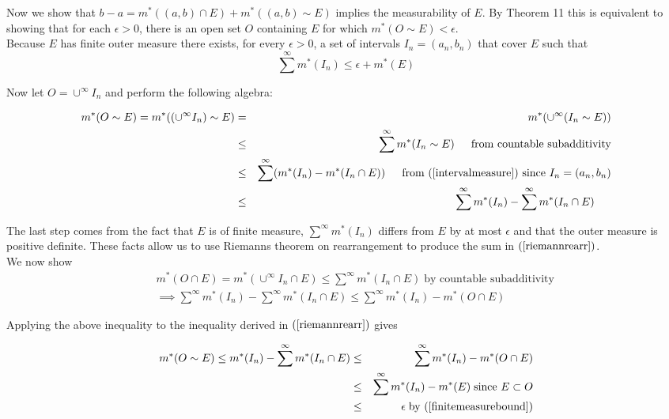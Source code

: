 \documentclass[11pt,reqno]{article}
\begin{document}
Now we show that $b - a =  m^*((a,b) \cap E) + m^*((a,b) \sim E)$ implies the measurability of $E$. By Theorem 11 this is equivalent to showing that for each $\epsilon > 0$,  there is an open set $O$ containing $E$ for which $m^*(O \sim E) < \epsilon$.\\

Because $E$ has finite outer measure there exists, for every $\epsilon > 0$, a set of intervals $I_n = (a_n, b_n)$ that cover $E$ such that 
\begin{equation} 
\sum^\infty m^*(I_n)  \le \epsilon  + m^*(E) \label{finitemeasurebound} 
\end{equation}

Now let $O = \cup^\infty I_n$ and perform the following algebra:

\begin{eqnarray}
m^*(O \sim E) = m^*((\cup^\infty I_n) \sim E) &=& m^*(\cup^\infty (I_n \sim E))  \nonumber \\
&\le& \sum^\infty m^*(I_n \sim E) \hspace{15px} \text{from countable subadditivity} \nonumber \\
&\le& \sum^\infty (m^*(I_n) -  m^*(I_n \cap E)) \hspace{15px} \text{from (\ref{intervalmeasure}) since $I_n = (a_n, b_n)$} \nonumber \\
&\le& \sum^\infty m^*(I_n) -  \sum^\infty m^*(I_n \cap E) \hspace{15px} \label{riemannrearr}
\end{eqnarray}

The last step comes from the fact that $E$ is of finite measure,  $\sum^\infty m^*(I_n)$ differs from $E$ by at most $\epsilon$ and that the outer measure is positive definite. These facts allow us to use Riemanns theorem on rearrangement to produce the sum in $(\ref{riemannrearr})$.\\
We now show
\begin{eqnarray*} 
&&m^*(O \cap E) =  m^*(\cup^\infty I_n \cap E) \le \sum^\infty  m^*(I_n \cap E) \; \text{by countable subadditivity}\\
&&\implies \sum^\infty m^*(I_n) -  \sum^\infty  m^*(I_n \cap E) \le \sum^\infty m^*(I_n) - m^*(O \cap E) 
\end{eqnarray*}

\noindent Applying the above inequality to the inequality derived in $(\ref{riemannrearr})$ gives

\begin{eqnarray*}
m^*(O \sim E) \le m^*(I_n) -  \sum^\infty m^*(I_n \cap E) &\le& \sum^\infty m^*(I_n) - m^*(O \cap E) \\
&\le& \sum^\infty m^*(I_n) - m^*(E) \; \text{since $E \subset O$} \\
&\le& \epsilon \; \text{by $(\ref{finitemeasurebound})$}
\end{eqnarray*}
\end{document}
